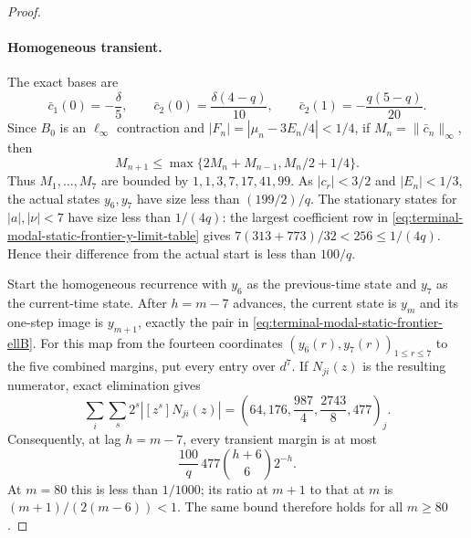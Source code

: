 \begin{proof}
\paragraph{Homogeneous transient.}
The exact bases are
\[
 \bar c_1(0)=-\frac\delta5,\qquad
 \bar c_2(0)=\frac{\delta(4-q)}{10},\qquad
 \bar c_2(1)=-\frac{q(5-q)}{20}.
\]
Since $B_0$ is an $\ell_\infty$ contraction and
$|F_n|=|\mu_n-3E_n/4|<1/4$, if
$M_n=\|\bar c_n\|_\infty$, then
\[
 M_{n+1}\le\max\{2M_n+M_{n-1},M_n/2+1/4\}.
\]
Thus $M_1,\ldots,M_7$ are bounded by
$1,1,3,7,17,41,99$.  As $|c_r|<3/2$ and $|E_n|<1/3$, the actual states
$y_6,y_7$ have size less than $(199/2)/q$.  The stationary states for
$|a|,|\nu|<7$ have size less than $1/(4q)$: the largest coefficient row in
\eqref{eq:terminal-modal-static-frontier-y-limit-table} gives
$7(313+773)/32<256\le1/(4q)$.  Hence their difference from the actual start
is less than $100/q$.

Start the homogeneous recurrence with $y_6$ as the previous-time state and
$y_7$ as the current-time state.  After $h=m-7$ advances, the current state
is $y_m$ and its one-step image is $y_{m+1}$, exactly the pair in
\eqref{eq:terminal-modal-static-frontier-ellB}.  For this map from the
fourteen coordinates $(y_6(r),y_7(r))_{1\le r\le7}$ to the five combined
margins, put every entry over $d^7$.  If $N_{ji}(z)$ is the resulting
numerator, exact elimination gives
\begin{equation}
 \sum_i\sum_s2^s|[z^s]N_{ji}(z)|
 =\left(64,176,\frac{987}{4},\frac{2743}{8},477\right)_j.
 \label{eq:terminal-modal-frontier-cutoff-transient-norms}
\end{equation}
Consequently, at lag $h=m-7$, every transient margin is at most
\begin{equation}
 \frac{100}{q}\,477\binom{h+6}{6}2^{-h}.
 \label{eq:terminal-modal-frontier-cutoff-transient}
\end{equation}
At $m=80$ this is less than $1/1000$; its ratio at $m+1$ to that at $m$ is
$(m+1)/(2(m-6))<1$.  The same bound therefore holds for all $m\ge80$.


\end{proof}
